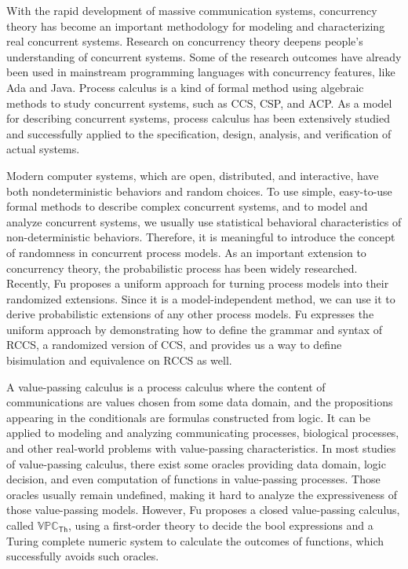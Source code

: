 
\begin{digest}
  With the rapid development of massive communication systems, concurrency theory has become an important methodology for modeling and characterizing real concurrent systems. Research on concurrency theory deepens people's understanding of concurrent systems. Some of the research outcomes have already been used in mainstream programming languages with concurrency features, like Ada and Java. Process calculus is a kind of formal method using algebraic methods to study concurrent systems, such as CCS, CSP, and ACP. As a model for describing concurrent systems, process calculus has been extensively studied and successfully applied to the specification, design, analysis, and verification of actual systems.

  Modern computer systems, which are open, distributed, and interactive, have both nondeterministic behaviors and random choices. To use simple, easy-to-use formal methods to describe complex concurrent systems, and to model and analyze concurrent systems, we usually use statistical behavioral characteristics of non-deterministic behaviors. Therefore, it is meaningful to introduce the concept of randomness in concurrent process models. As an important extension to concurrency theory, the probabilistic process has been widely researched. Recently, Fu proposes a uniform approach for turning process models into their randomized extensions. Since it is a model-independent method, we can use it to derive probabilistic extensions of any other process models. Fu expresses the uniform approach by demonstrating how to define the grammar and syntax of RCCS, a randomized version of CCS, and provides us a way to define bisimulation and equivalence on RCCS as well.

  A value-passing calculus is a process calculus where the content of communications are values chosen from some data domain, and the propositions appearing in the conditionals are formulas constructed from logic. It can be applied to modeling and analyzing communicating processes, biological processes, and other real-world problems with value-passing characteristics. In most studies of value-passing calculus, there exist some oracles providing data domain, logic decision, and even computation of functions in value-passing processes. Those oracles usually remain undefined, making it hard to analyze the expressiveness of those value-passing models. However, Fu proposes a closed value-passing calculus, called $\mathbb{VPC}_{\mathsf{Th}}$, using a first-order theory to decide the bool expressions and a Turing complete numeric system to calculate the outcomes of functions, which successfully avoids such oracles. 
  

\end{digest}
